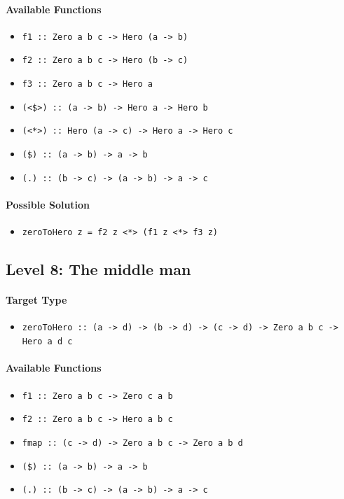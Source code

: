 \documentclass[preprint,12pt]{elsarticle}
\begin{document}
\paragraph{Available Functions} 
\begin{itemize}
    \item \texttt{f1 :: Zero a b c -> Hero (a -> b)}
    \item \texttt{f2 :: Zero a b c -> Hero (b -> c)}
    \item \texttt{f3 :: Zero a b c -> Hero a}
    \item \texttt{(<\$>) :: (a -> b) -> Hero a -> Hero b}
    \item \texttt{(<*>) :: Hero (a -> c) -> Hero a -> Hero c}
    \item \texttt{(\$) :: (a -> b) -> a -> b}
    \item \texttt{(.) :: (b -> c) -> (a -> b) -> a -> c}
\end{itemize}

\paragraph{Possible Solution} 
\begin{itemize}
    \item \texttt{zeroToHero z = f2 z <*> (f1 z <*> f3 z)}
\end{itemize}

\subsection{Level 8: The middle man}
\paragraph{Target Type } 
\begin{itemize}
    \item \texttt{zeroToHero :: (a -> d) -> (b -> d) -> (c -> d) -> Zero a b c ->  Hero a d c}
\end{itemize}

\paragraph{Available Functions} 
\begin{itemize}
    \item \texttt{f1 :: Zero a b c -> Zero c a b}
    \item \texttt{f2 :: Zero a b c -> Hero a b c}
    \item \texttt{fmap :: (c -> d) -> Zero a b c -> Zero a b d}
    \item \texttt{(\$) :: (a -> b) -> a -> b}
    \item \texttt{(.) :: (b -> c) -> (a -> b) -> a -> c}
\end{itemize}
\end{document}
